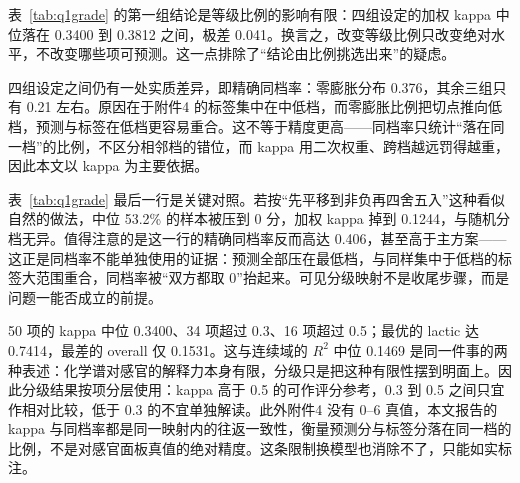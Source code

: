 表~\ref{tab:q1grade} 的第一组结论是等级比例的影响有限：四组设定的加权 kappa 中位落在 0.3400 到 0.3812 之间，极差 0.041。换言之，改变等级比例只改变绝对水平，不改变哪些项可预测。这一点排除了“结论由比例挑选出来”的疑虑。

四组设定之间仍有一处实质差异，即精确同档率：零膨胀分布 0.376，其余三组只有 0.21 左右。原因在于附件4 的标签集中在中低档，而零膨胀比例把切点推向低档，预测与标签在低档更容易重合。这不等于精度更高——同档率只统计“落在同一档”的比例，不区分相邻档的错位，而 kappa 用二次权重、跨档越远罚得越重，因此本文以 kappa 为主要依据。

表~\ref{tab:q1grade} 最后一行是关键对照。若按“先平移到非负再四舍五入”这种看似自然的做法，中位 53.2\% 的样本被压到 0 分，加权 kappa 掉到 0.1244，与随机分档无异。值得注意的是这一行的精确同档率反而高达 0.406，甚至高于主方案——这正是同档率不能单独使用的证据：预测全部压在最低档，与同样集中于低档的标签大范围重合，同档率被“双方都取 0”抬起来。可见分级映射不是收尾步骤，而是问题一能否成立的前提。

50 项的 kappa 中位 0.3400、34 项超过 0.3、16 项超过 0.5；最优的 lactic 达 0.7414，最差的 overall 仅 0.1531。这与连续域的 $R^2$ 中位 0.1469 是同一件事的两种表述：化学谱对感官的解释力本身有限，分级只是把这种有限性摆到明面上。因此分级结果按项分层使用：kappa 高于 0.5 的可作评分参考，0.3 到 0.5 之间只宜作相对比较，低于 0.3 的不宜单独解读。此外附件4 没有 0--6 真值，本文报告的 kappa 与同档率都是同一映射内的往返一致性，衡量预测分与标签分落在同一档的比例，不是对感官面板真值的绝对精度。这条限制换模型也消除不了，只能如实标注。
